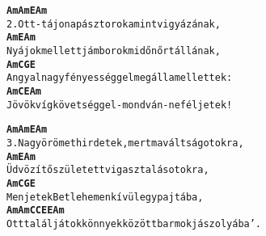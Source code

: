 \newpage
{}
\kottastart
{}
\kottaend
\begin{minipage}{\textwidth}
\begin{alltt}
\textbf{   Am                      Am     E    Am}
2. Ott - tájon a pásztorok amint vigyázának,
\textbf{    Am                      E           Am}
   Nyájok mellett jámborok midőn őrt állának,
\textbf{   Am              C         G          E}
   Angyal nagy fényességgel megálla mellettek:
\textbf{    Am          C           E               Am}
   Jövök víg követséggel - mondván - ne féljetek!
\end{alltt}
\vspace{0.0cm}
\versszakspacing
\end{minipage}
\begin{minipage}{\textwidth}
\begin{alltt}
\textbf{    Am                    Am      E       Am}
3. Nagy örömet hirdetek, mert ma váltságotokra,
\textbf{    Am                 E           Am}
   Üdvözítő született vigasztalásotokra,
\textbf{   Am           C       G            E}
   Menjetek Betlehemen kívül egy pajtába,
\textbf{   Am   Am   C     C   E          E            Am}
   Ott találjátok könnyek között barmok jászolyába'.
\end{alltt}
\vspace{0.0cm}
\versszakspacing
\end{minipage}
